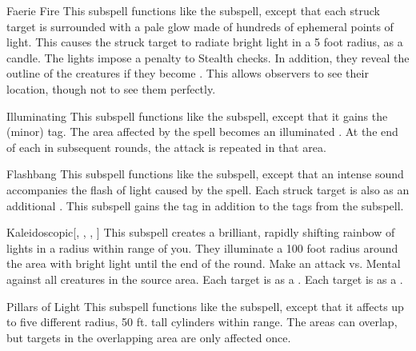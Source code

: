 \begin{ability}[\nth{2}]{Faerie Fire}
This subspell functions like the  subspell, except that each struck target is surrounded with a pale glow made of hundreds of ephemeral points of light.
This causes the struck target to radiate bright light in a 5 foot radius, as a candle.
The lights impose a  penalty to Stealth checks.
In addition, they reveal the outline of the creatures if they become .
This allows observers to see their location, though not to see them perfectly.
\end{ability}
\vspace{0.25em}


\begin{ability}[\nth{2}]{Illuminating}
This subspell functions like the  subspell, except that it gains the  (minor) tag.
The area affected by the spell becomes an illuminated .
At the end of each  in subsequent rounds, the attack is repeated in that area.
\end{ability}
\vspace{0.25em}


\begin{ability}[\nth{3}]{Flashbang}
This subspell functions like the  subspell, except that an intense sound accompanies the flash of light caused by the spell.
Each struck target is also  as an additional .
This subspell gains the  tag in addition to the tags from the  subspell.
\end{ability}
\vspace{0.25em}


\begin{ability}[\nth{3}]{Kaleidoscopic}[, , , ]
This subspell creates a brilliant, rapidly shifting rainbow of lights in a \areasmall radius within \rngmed range of you.
They illuminate a 100 foot radius around the area with bright light until the end of the round.
Make an attack vs. Mental against all creatures in the source area.
\hit Each target is \disoriented as a .
\crit Each target is \confused as a .
\end{ability}
\vspace{0.25em}


\begin{ability}[\nth{3}]{Pillars of Light}
This subspell functions like the  subspell, except that it affects up to five different \areasmall radius, 50 ft. tall cylinders within range.
The areas can overlap, but targets in the overlapping area are only affected once.
\end{ability}
\vspace{0.25em}


